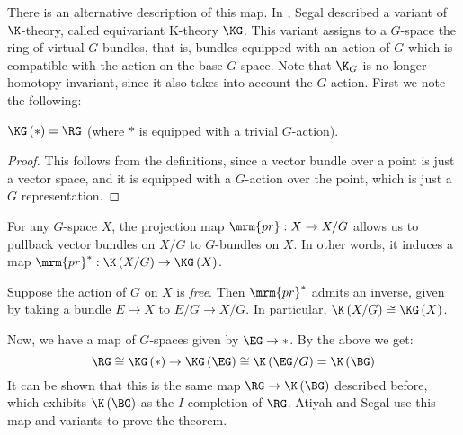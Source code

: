 There is an alternative description of this map.
In \cite{Seg}, Segal described a variant of $\K$-theory, called equivariant K-theory $\KG$.
This variant assigns to a $G$-space the ring of virtual $G$-bundles, that is, bundles equipped with an action of $G$ which is compatible with the action on the base $G$-space.
Note that $\K_G$ is no longer homotopy invariant, since it also takes into account the $G$-action.
First we note the following:

\begin{proposition}
	$\KG\left(*\right) = \RG$ (where $*$ is equipped with a trivial $G$-action).
\end{proposition}

\begin{proof}
	This follows from the definitions, since a vector bundle over a point is just a vector space, and it is equipped with a $G$-action over the point, which is just a $G$ representation.
\end{proof}

For any $G$-space $X$, the projection map $\mrm{pr}: X \to X/G$ allows us to pullback vector bundles on $X/G$ to $G$-bundles on $X$.
In other words, it induces a map $\mrm{pr}^*: \K\left(X/G\right) \to \KG\left(X\right)$.

\begin{proposition}
	Suppose the action of $G$ on $X$ is \emph{free}. Then $\mrm{pr}^*$ admits an inverse, given by taking a bundle $E \to X$ to $E/G \to X/G$.
	In particular, $\K\left(X/G\right) \cong \KG\left(X\right)$.
\end{proposition}

Now, we have a map of $G$-spaces given by $\EG \to *$.
By the above we get:
$$
\RG
\cong \KG\left(*\right)
\to \KG\left(\EG\right)
\cong \K\left(\EG/G\right)
= \K\left(\BG\right)
$$
It can be shown that this is the same map $\RG \to \K\left(\BG\right)$ described before, which exhibits $\K\left(\BG\right)$ as the $I$-completion of $\RG$.
Atiyah and Segal use this map and variants to prove the theorem.


